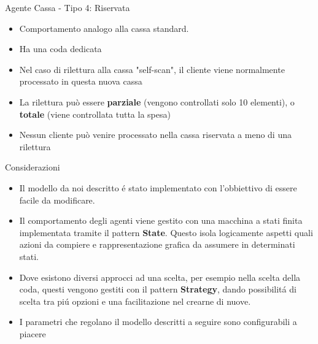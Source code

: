 \begin{frame}{Agente Cassa - Tipo 4: Riservata}
	
	\begin{itemize}
		\item Comportamento analogo alla cassa standard.
		\item Ha una coda dedicata
		\item Nel caso di rilettura alla cassa "self-scan", il cliente viene normalmente processato in questa nuova cassa
		\item La rilettura può essere \textbf{parziale} (vengono controllati solo 10 elementi), o \textbf{totale} (viene controllata tutta la spesa)
		\item Nessun cliente può venire processato nella cassa riservata a meno di una rilettura
	\end{itemize}
\end{frame}




\begin{frame}{Considerazioni}
  \begin{itemize}
  \item Il modello da noi descritto é stato implementato con
    l'obbiettivo di essere facile da modificare.
    
  \item Il comportamento degli agenti viene gestito con una
    macchina a stati finita implementata tramite il pattern
    \textbf{State}.  Questo isola logicamente aspetti quali
    azioni da compiere e rappresentazione grafica da assumere in
    determinati stati.

  \item Dove esistono diversi approcci ad una scelta, per
    esempio nella scelta della coda, questi vengono gestiti con
    il pattern \textbf{Strategy}, dando possibilitá di scelta
    tra piú opzioni e una facilitazione nel crearne di nuove.

  \item I parametri che regolano il modello descritti a seguire
    sono configurabili a piacere
  \end{itemize}
\end{frame}




